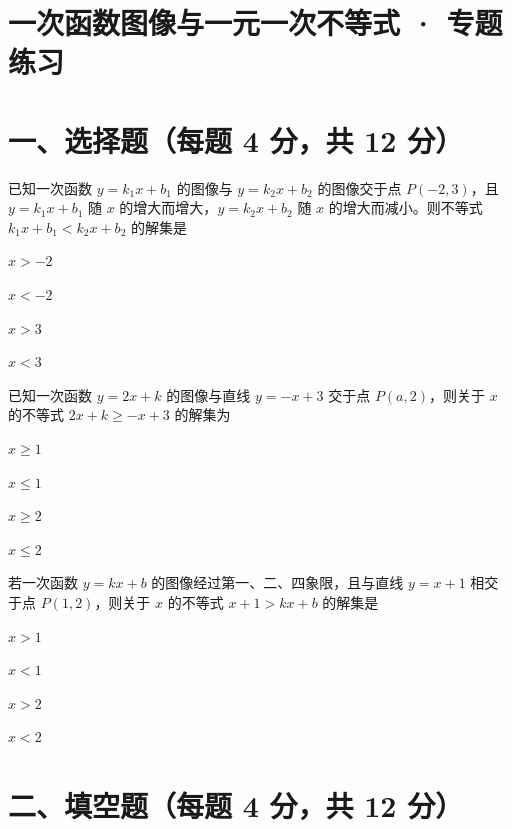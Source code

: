 \documentclass{exam-zh}
\begin{document}
\section*{一次函数图像与一元一次不等式 · 专题练习}

\section*{一、选择题（每题 4 分，共 12 分）}


\begin{question}[points=4]
  已知一次函数 $y = k_1x + b_1$ 的图像与 $y = k_2x + b_2$ 的图像交于点 $P(-2, 3)$，且 $y = k_1x + b_1$ 随 $x$ 的增大而增大，$y = k_2x + b_2$ 随 $x$ 的增大而减小。则不等式 $k_1x + b_1 < k_2x + b_2$ 的解集是
  \begin{choices}
    \item $x > -2$
    \item $x < -2$
    \item $x > 3$
    \item $x < 3$
  \end{choices}
\end{question}



\begin{question}[points=4]
  已知一次函数 $y = 2x + k$ 的图像与直线 $y = -x + 3$ 交于点 $P(a, 2)$，则关于 $x$ 的不等式 $2x + k \ge -x + 3$ 的解集为
  \begin{choices}
    \item $x \ge 1$
    \item $x \le 1$
    \item $x \ge 2$
    \item $x \le 2$
  \end{choices}
\end{question}



\begin{question}[points=4]
  若一次函数 $y = kx + b$ 的图像经过第一、二、四象限，且与直线 $y = x + 1$ 相交于点 $P(1, 2)$，则关于 $x$ 的不等式 $x + 1 > kx + b$ 的解集是
  \begin{choices}
    \item $x > 1$
    \item $x < 1$
    \item $x > 2$
    \item $x < 2$
  \end{choices}
\end{question}


\section*{二、填空题（每题 4 分，共 12 分）}
\end{document}
